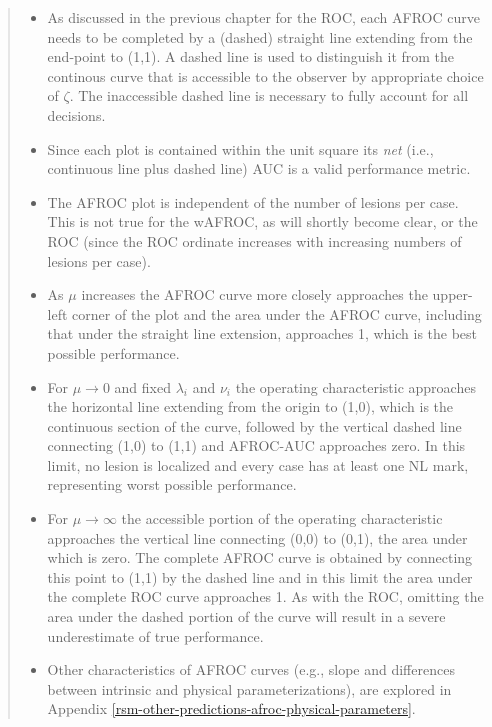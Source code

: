 \documentclass[
]{book}
\providecommand{\tightlist}{%
  \setlength{\itemsep}{0pt}\setlength{\parskip}{0pt}}
\begin{document}
\begin{quote}
\begin{itemize}
\tightlist
\item
  As discussed in the previous chapter for the ROC, each AFROC curve needs to be completed by a (dashed) straight line extending from the end-point to (1,1). A dashed line is used to distinguish it from the continous curve that is accessible to the observer by appropriate choice of \(\zeta\). The inaccessible dashed line is necessary to fully account for all decisions.
\item
  Since each plot is contained within the unit square its \emph{net} (i.e., continuous line plus dashed line) AUC is a valid performance metric.
\item
  The AFROC plot is independent of the number of lesions per case. This is not true for the wAFROC, as will shortly become clear, or the ROC (since the ROC ordinate increases with increasing numbers of lesions per case).
\item
  As \(\mu\) increases the AFROC curve more closely approaches the upper-left corner of the plot and the area under the AFROC curve, including that under the straight line extension, approaches 1, which is the best possible performance.
\item
  For \(\mu \to 0\) and fixed \(\lambda_i\) and \(\nu_i\) the operating characteristic approaches the horizontal line extending from the origin to (1,0), which is the continuous section of the curve, followed by the vertical dashed line connecting (1,0) to (1,1) and AFROC-AUC approaches zero. In this limit, no lesion is localized and every case has at least one NL mark, representing worst possible performance.
\item
  For \(\mu \to \infty\) the accessible portion of the operating characteristic approaches the vertical line connecting (0,0) to (0,1), the area under which is zero. The complete AFROC curve is obtained by connecting this point to (1,1) by the dashed line and in this limit the area under the complete ROC curve approaches 1. As with the ROC, omitting the area under the dashed portion of the curve will result in a severe underestimate of true performance.
\item
  Other characteristics of AFROC curves (e.g., slope and differences between intrinsic and physical parameterizations), are explored in Appendix \ref{rsm-other-predictions-afroc-physical-parameters}.
\end{itemize}
\end{quote}
\end{document}
